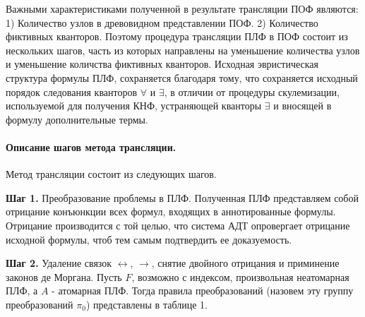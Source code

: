 \documentclass[a4paper]{jctart15b}
\begin{document}





Важными характеристиками полученной в результате трансляции ПОФ являются: 1) Количество узлов в древовидном представлении ПОФ. 2) Количество фиктивных кванторов. Поэтому процедура трансляции ПЛФ в ПОФ состоит из нескольких шагов, часть из которых направлены на уменьшение количества узлов и уменьшение количства фиктивных кванторов. Исходная эвристическая структура формулы ПЛФ, сохраняется благодаря тому, что сохраняется исходный порядок следования кванторов $\forall$ и $\exists$, в отличии от процедуры скулемизации, используемой для получения КНФ, устраняющей кванторы $\exists$ и вносящей в формулу дополнительные термы.

\paragraph{Описание шагов метода трансляции.}

Метод трансляции состоит из следующих шагов.

\textbf{Шаг 1.} Преобразование проблемы в ПЛФ. Полученная ПЛФ представляем собой отрицание конъюнкции всех формул, входящих в аннотированные формулы. Отрицание производится с той целью, что система АДТ опровергает отрицание исходной формулы, чтоб тем самым подтвердить ее доказуемость. %

\textbf{Шаг 2.} Удаление связок $\leftrightarrow$, $\rightarrow$, снятие двойного отрицания и приминение законов де Моргана. Пусть $F$, возможно с индексом, произвольная неатомарная ПЛФ, а $A$ - атомарная ПЛФ. Тогда правила преобразований (назовем эту группу преобразований $\pi_0$) представлены в таблице 1.
\end{document}
